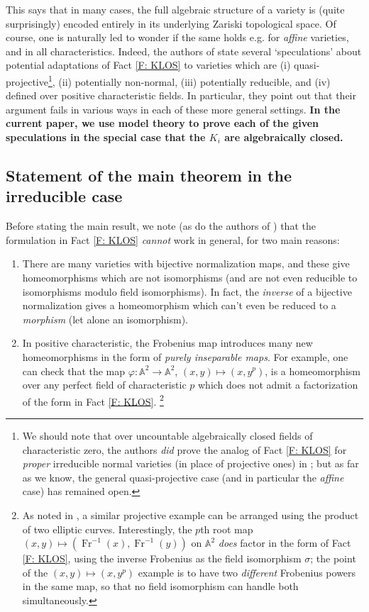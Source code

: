 \documentclass{amsart}
\theoremstyle{definition}
\begin{document}
This says that in many cases, the full algebraic structure of a variety is (quite surprisingly) encoded entirely in its underlying Zariski topological space. Of course, one is naturally led to wonder if the same holds e.g. for \textit{affine} varieties, and in all characteristics. Indeed, the authors of \cite{KLOS} state several `speculations' about potential adaptations of Fact \ref{F: KLOS} to varieties which are (i) quasi-projective\footnote{We should note that over uncountable algebraically closed fields of characteristic zero, the authors \textit{did} prove the analog of Fact \ref{F: KLOS} for \textit{proper} irreducible normal varieties (in place of projective ones) in \cite{OlderKLOS}; but as far as we know, the general quasi-projective case (and in particular the \textit{affine} case) has remained open.}, (ii) potentially non-normal, (iii) potentially reducible, and (iv) defined over positive characteristic fields. In particular, they point out that their argument fails in various ways in each of these more general settings. \textbf{In the current paper, we use model theory to prove each of the given speculations in the special case that the $K_i$ are algebraically closed.} 

\subsection{Statement of the main theorem in the irreducible case}

Before stating the main result, we note (as do the authors of \cite{KLOS}) that the formulation in Fact \ref{F: KLOS} \textit{cannot} work in general, for two main reasons:

\begin{enumerate}
    \item There are many varieties with bijective normalization maps, and these give homeomorphisms which are not isomorphisms (and are not even reducible to isomorphisms modulo field isomorphisms). In fact, the \textit{inverse} of a bijective normalization gives a homeomorphism which can't even be reduced to a \textit{morphism} (let alone an isomorphism).
    \item In positive characteristic, the Frobenius map introduces many new homeomorphisms in the form of \textit{purely inseparable maps}. For example, one can check that the map $\varphi:\mathbb A^2\rightarrow\mathbb A^2$, $(x,y)\mapsto(x,y^p)$, is a homeomorphism over any perfect field of characteristic $p$ which does not admit a factorization of the form in Fact \ref{F: KLOS}. \footnote{As noted in \cite{KLOS}, a similar projective example can be arranged using the product of two elliptic curves. Interestingly, the $p$th root map $(x,y)\mapsto(\operatorname{
    Fr}^{-1}(x),\operatorname{Fr}^{-1}(y))$ on $\mathbb A^2$ \textit{does} factor in the form of Fact \ref{F: KLOS}, using the inverse Frobenius as the field isomorphism $\sigma$; the point of the $(x,y)\mapsto(x,y^p)$ example is to have two \textit{different} Frobenius powers in the same map, so that no field isomorphism can handle both simultaneously.}
\end{enumerate}
\end{document}
